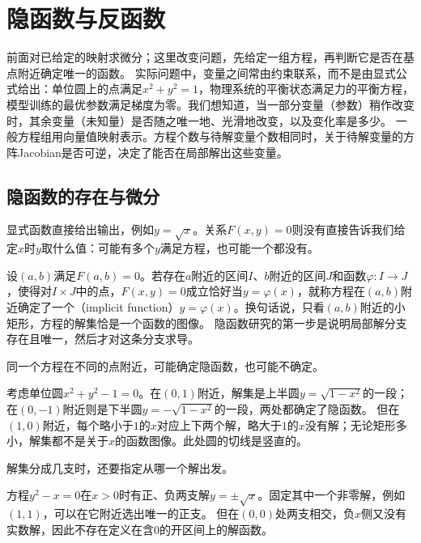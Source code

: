 

\section{隐函数与反函数}
\label{sec:analysis-implicit-parameter-integral}

前面对已给定的映射求微分；这里改变问题，先给定一组方程，再判断它是否在基点附近确定唯一的函数。
实际问题中，变量之间常由约束联系，而不是由显式公式给出：单位圆上的点满足$x^2+y^2=1$，物理系统的平衡状态满足力的平衡方程，模型训练的最优参数满足梯度为零。我们想知道，当一部分变量（参数）稍作改变时，其余变量（未知量）是否随之唯一地、光滑地改变，以及变化率是多少。
一般方程组用向量值映射表示。方程个数与待解变量个数相同时，关于待解变量的方阵Jacobian是否可逆，决定了能否在局部解出这些变量。

\subsection{隐函数的存在与微分}

显式函数直接给出输出，例如$y=\sqrt x$。关系$F(x,y)=0$则没有直接告诉我们给定$x$时$y$取什么值：可能有多个$y$满足方程，也可能一个都没有。

设$(a,b)$满足$F(a,b)=0$。若存在$a$附近的区间$I$、$b$附近的区间$J$和函数$\varphi:I\to J$，使得对$I\times J$中的点，$F(x,y)=0$成立恰好当$y=\varphi(x)$，就称方程在$(a,b)$附近确定了一个（implicit function）$y=\varphi(x)$。换句话说，只看$(a,b)$附近的小矩形，方程的解集恰是一个函数的图像。
隐函数研究的第一步是说明局部解分支存在且唯一，然后才对这条分支求导。

同一个方程在不同的点附近，可能确定隐函数，也可能不确定。
\begin{example}[单位圆附近的隐函数]
\label{ex:multivariable-implicit-circle}
考虑单位圆$x^2+y^2-1=0$。在$(0,1)$附近，解集是上半圆$y=\sqrt{1-x^2}$的一段；在$(0,-1)$附近则是下半圆$y=-\sqrt{1-x^2}$的一段，两处都确定了隐函数。
但在$(1,0)$附近，每个略小于$1$的$x$对应上下两个解，略大于$1$的$x$没有解；无论矩形多小，解集都不是关于$x$的函数图像。此处圆的切线是竖直的。
\end{example}

解集分成几支时，还要指定从哪一个解出发。
\begin{example}[方程$y^2=x$的两支解]
\label{ex:multivariable-implicit-parabola-branches}
方程$y^2-x=0$在$x>0$时有正、负两支解$y=\pm\sqrt x$。固定其中一个非零解，例如$(1,1)$，可以在它附近选出唯一的正支。
但在$(0,0)$处两支相交，负$x$侧又没有实数解，因此不存在定义在含$0$的开区间上的解函数。
\end{example}

